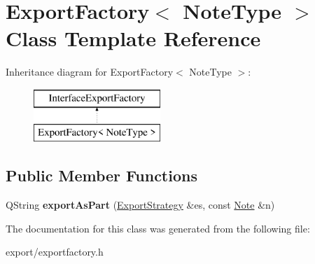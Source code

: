 \hypertarget{class_export_factory}{\section{Export\-Factory$<$ Note\-Type $>$ Class Template Reference}
\label{class_export_factory}
}
Inheritance diagram for Export\-Factory$<$ Note\-Type $>$\-:\begin{figure}[H]
\begin{center}
\leavevmode
\includegraphics[height=2.000000cm]{class_export_factory}
\end{center}
\end{figure}
\subsection*{Public Member Functions}
\begin{DoxyCompactItemize}
\item 
\hypertarget{class_export_factory_a82a8b5ddf1c0ba678b371f6766578a1d}{Q\-String {\bfseries export\-As\-Part} (\hyperlink{class_export_strategy}{Export\-Strategy} \&es, const \hyperlink{class_note}{Note} \&n)}\label{class_export_factory_a82a8b5ddf1c0ba678b371f6766578a1d}

\end{DoxyCompactItemize}


The documentation for this class was generated from the following file\-:\begin{DoxyCompactItemize}
\item 
export/exportfactory.\-h\end{DoxyCompactItemize}

